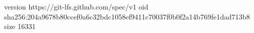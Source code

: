 version https://git-lfs.github.com/spec/v1
oid sha256:204a9678b80ccef0a6c32bdc1058ef9411c70037f0b0f2a14b769fe1dad713b8
size 16331
